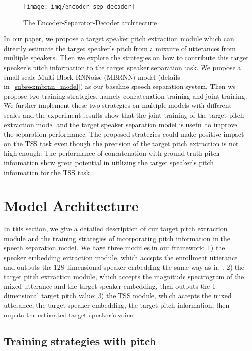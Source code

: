 \documentclass[
]{article}
\begin{document}
    \begin{figure}[!t]
        \centering
        \texttt{[image: img/encoder\_sep\_decoder]}
        \caption{The Encoder-Separator-Decoder architecture}
        \label{fig:enc_sep_doc_arc}
    \end{figure}

    In our paper, we propose a target speaker pitch extraction module which can directly estimate the target speaker's pitch from a mixture of utterances from multiple speakers.
    Then we explore the strategies on how to contribute this target speaker's pitch information to the target speaker separation task.
    We propose a small scale Multi-Block RNNoise (MBRNN) model (details in~\ref{subsec:mbrnn_model}) as our baseline speech separation system.
    Then we propose two training strategies, namely concatenation training and joint training.
    We further implement these two strategies on multiple models with different scales and the experiment results show that the joint training of the target pitch extraction model and the target speaker separation model is useful to improve the separation performance.
    The proposed strategies could make positive impact on the TSS task even though the precision of the target pitch extraction is not high enough.
    The performance of concatenation with ground-truth pitch information show great potential in utilizing the target speaker's pitch information for the TSS task.


    \section{Model Architecture}
    \label{sec:architecture}

    In this section, we give a detailed description of our target pitch extraction module and the training strategies of incorporating pitch information in the speech separation model.
    We have three modules in our framework: 1) the speaker embedding extraction module, which accepts the enrollment utterance and outputs the 128-dimensional speaker embedding the same way as in~\cite{li20p_interspeech}. 2) the target pitch extraction module, which accepts the magnitude spectrogram of the mixed utterance and the target speaker embedding, then outputs the 1-dimensional target pitch value; 3) the TSS module, which accepts the mixed utterance, the target speaker embedding, the target pitch information, then ouputs the estimated target speaker's voice.

    \subsection{Training strategies with pitch}
    \label{subsec:two_training_strategy}
\end{document}

